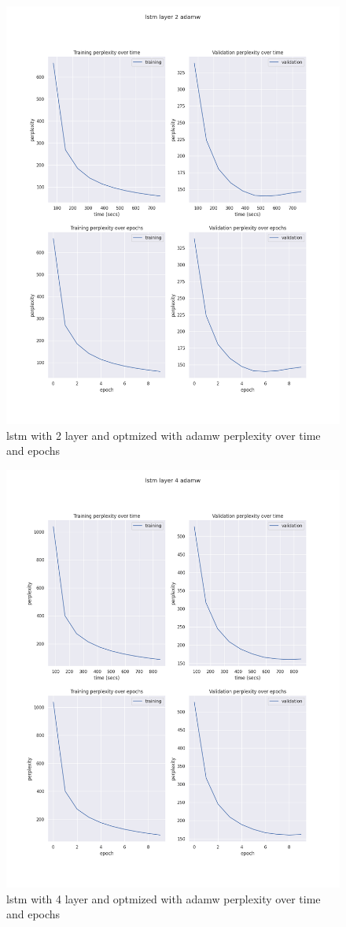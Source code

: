 \documentclass[12pt]{article}
\theoremstyle{definition}
\begin{document}
\begin{figure}[H]
     \centering
     \includegraphics[scale=0.4]{lstm_layer_2_adamw.png}
     \caption{lstm with 2 layer and optmized with adamw perplexity over time and epochs}
\end{figure}
\begin{figure}[H]
     \centering
     \includegraphics[scale=0.4]{lstm_layer_4_adamw.png}
     \caption{lstm with 4 layer and optmized with adamw perplexity over time and epochs}
\end{figure}
\end{document}
